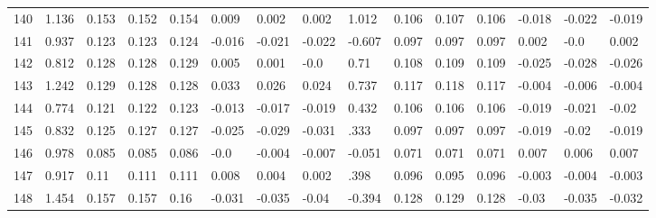\begin{table}
\begin{tabular}{|l|l|lll|lll|l|lll|lll}
		140 & 1.136 & 0.153 & 0.152 & 0.154 & 0.009 & 0.002 & 0.002 & 1.012 & 0.106 & 0.107 & 0.106 & -0.018 & -0.022 & -0.019 \\
		141 & 0.937 & 0.123 & 0.123 & 0.124 & -0.016 & -0.021 & -0.022 & -0.607 & 0.097 & 0.097 & 0.097 & 0.002 & -0.0 & 0.002 \\
		142 & 0.812 & 0.128 & 0.128 & 0.129 & 0.005 & 0.001 & -0.0 & 0.71 & 0.108 & 0.109 & 0.109 & -0.025 & -0.028 & -0.026 \\
		143 & 1.242 & 0.129 & 0.128 & 0.128 & 0.033 & 0.026 & 0.024 & 0.737 & 0.117 & 0.118 & 0.117 & -0.004 & -0.006 & -0.004 \\
		144 & 0.774 & 0.121 & 0.122 & 0.123 & -0.013 & -0.017 & -0.019 & 0.432 & 0.106 & 0.106 & 0.106 & -0.019 & -0.021 & -0.02 \\
		145 & 0.832 & 0.125 & 0.127 & 0.127 & -0.025 & -0.029 & -0.031 & .333 & 0.097 & 0.097 & 0.097 & -0.019 & -0.02 & -0.019 \\
		146 & 0.978 & 0.085 & 0.085 & 0.086 & -0.0 & -0.004 & -0.007 & -0.051 & 0.071 & 0.071 & 0.071 & 0.007 & 0.006 & 0.007 \\
		147 & 0.917 & 0.11 & 0.111 & 0.111 & 0.008 & 0.004 & 0.002 & .398 & 0.096 & 0.095 & 0.096 & -0.003 & -0.004 & -0.003 \\
		148 & 1.454 & 0.157 & 0.157 & 0.16 & -0.031 & -0.035 & -0.04 & -0.394 & 0.128 & 0.129 & 0.128 & -0.03 & -0.035 & -0.032 
	\end{tabular}
	
\end{table}
